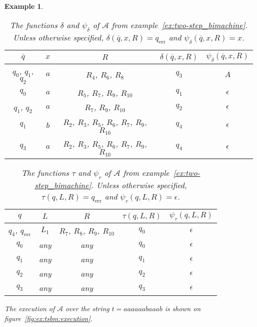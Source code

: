 \documentclass{article}
\newtheorem{example}[definition]{Example}
\begin{document}
\begin{example}
		\begin{table}[h!]
			\centering
			\begin{tabular}{c|c|c|c|c}
				$\overline{q}$ & $x$ & $R$ & $\delta(\overline{q}, x, R)$ & $\psi_\delta(\overline{q}, x, R)$ \\ \hline\hline
				$q_0$, $q_1$, $q_2$ & $a$ & $R_4$, $R_6$, $R_8$ & $q_3$ & $A$ \\ \hline
				$q_0$ & $a$ & $R_5$, $R_7$, $R_9$, $R_{10}$ & $q_1$ & $\epsilon$ \\ \hline
				$q_1$, $q_2$ & $a$ & $R_7$, $R_9$, $R_{10}$ & $q_2$ & $\epsilon$ \\ \hline
				$q_1$ & $b$ & $R_2$, $R_3$, $R_5$, $R_6$, $R_7$, $R_9$, $R_{10}$ & $q_4$ & $\epsilon$ \\ \hline
				$q_3$ & $a$ & $R_2$, $R_3$, $R_5$, $R_6$, $R_7$, $R_9$, $R_{10}$ & $q_4$ & $\epsilon$ \\
			\end{tabular}
			\caption{The functions $\delta$ and $\psi_\delta$ of $\mathcal{A}$ from example~\ref{ex:two-step_bimachine}.
				Unless otherwise specified, $\delta(\overline{q}, x, R) = q_\mathrm{err}$ and $\psi_\delta(\overline{q}, x, R) = x$.}
			\label{table:ex:tsbm:delta,tau_delta}
		\end{table}
		\begin{table}[h!]
			\centering
			\begin{tabular}{c|c|c|c|c}
				$q$ & $L$ & $R$ & $\tau(q, L, R)$ & $\psi_\tau(q, L, R)$ \\ \hline\hline
				$q_4$, $q_\mathrm{err}$ & $L_1$ & $R_7$, $R_8$, $R_9$, $R_{10}$ & $q_0$ & $\epsilon$ \\ \hline
				$q_0$ & any & any & $q_0$ & $\epsilon$ \\ \hline
				$q_1$ & any & any & $q_1$ & $\epsilon$ \\ \hline
				$q_2$ & any & any & $q_2$ & $\epsilon$ \\ \hline
				$q_3$ & any & any & $q_3$ & $\epsilon$ \\
			\end{tabular}
			\caption{The functions $\tau$ and $\psi_\tau$ of $\mathcal{A}$ from example~\ref{ex:two-step_bimachine}.
				Unless otherwise specified, $\tau(q, L, R) = q_\mathrm{err}$ and $\psi_\tau(q, L, R) = \epsilon$.}
			\label{table:ex:tsbm:tau}
		\end{table}
		The execution of $\mathcal{A}$ over the string $t=aaaaaabaaab$ is shown on figure~\ref{fig:ex:tsbm:execution}.
		\begin{figure}[h]

\end{figure}
\end{example}
\end{document}
